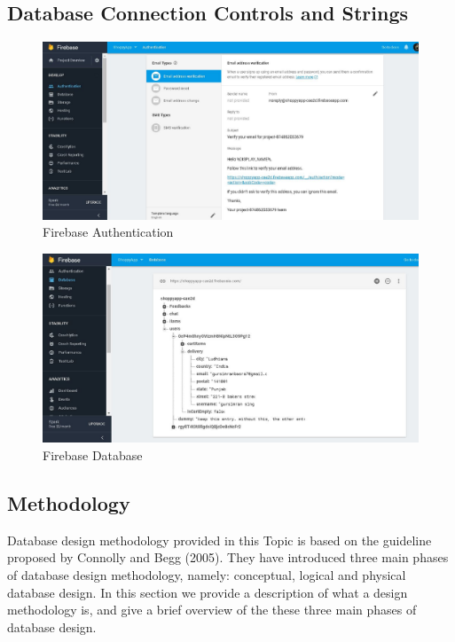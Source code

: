 \subsection{Database Connection Controls and Strings}

\begin{figure}[ht]
\centering
\includegraphics[scale=0.40]{images/firbase14.png}
\caption{Firebase Authentication}
\end{figure}


\begin{figure}[ht]
\centering
\includegraphics[scale=0.40]{images/Firebase12.png}
\caption{Firebase Database}
\end{figure}

\subsection{Methodology}
Database design methodology provided in this Topic is based on the guideline proposed by Connolly and Begg (2005). They have introduced three main phases of database design methodology, namely: conceptual, logical and physical database design. In this section we provide a description of what a design methodology is, and give a brief overview of the these three main phases of database design.

